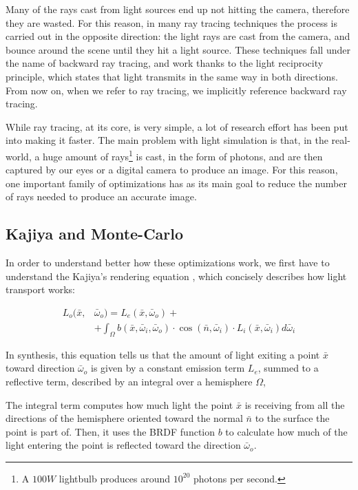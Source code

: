 \documentclass[11pt,a4paper,twocolumn]{article}
\begin{document}
Many of the rays cast from light sources end up not hitting the camera, therefore they are wasted. For this reason, in many ray tracing techniques the process is carried out in the opposite direction: the light rays are cast from the camera, and bounce around the scene until they hit a light source. These techniques fall under the name of backward ray tracing, and work thanks to the light reciprocity principle, which states that light transmits in the same way in both directions. From now on, when we refer to ray tracing, we implicitly reference backward ray tracing.

While ray tracing, at its core, is very simple, a lot of research effort has been put into making it faster. The main problem with light simulation is that, in the real-world, a huge amount of rays\footnote{A $100W$ lightbulb produces around $10^{20}$ photons per second.} is cast, in the form of photons, and are then captured by our eyes or a digital camera to produce an image. For this reason, one important family of optimizations has as its main goal to reduce the number of rays needed to produce an accurate image.

\subsection{Kajiya and Monte-Carlo}
In order to understand better how these optimizations work, we first have to understand the Kajiya's rendering equation \cite{rendering_equation}, which concisely describes how light transport works:

\begin{subequations}
    \begin{align*}
        L_o(\bar{x},&\bar{\omega}_o) = L_e(\bar{x}, \bar{\omega}_o) +\\
        &+\int_\Omega b(\bar{x}, \bar{\omega}_i, \bar{\omega}_o) \cdot \cos(\bar{n}, \bar{\omega}_i) \cdot L_i(\bar{x}, \bar{\omega}_i) d\bar{\omega}_i
    \end{align*}
\end{subequations}

In synthesis, this equation tells us that the amount of light exiting a point $\bar{x}$ toward direction $\bar{\omega}_o$ is given by a constant emission term $L_e$, summed to a reflective term, described by an integral over a hemisphere $\Omega$,

The integral term computes how much light the point $\bar{x}$ is receiving from all the directions of the hemisphere oriented toward the normal $\bar{n}$ to the surface the point is part of. Then, it uses the BRDF function $b$ to calculate how much of the light entering the point is reflected toward the direction $\bar{\omega}_o$.
\end{document}
